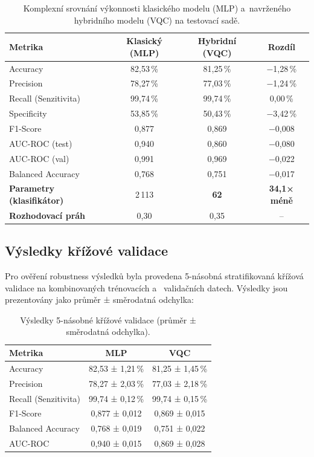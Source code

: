 \documentclass[12pt, a4paper]{report}
\begin{document}
\begin{table}[htbp]
    \centering
    \caption{Komplexní srovnání výkonnosti klasického modelu (MLP) a~navrženého hybridního modelu (VQC) na testovací sadě.}
    \label{tab:vysledky}
    \small
    \renewcommand{\arraystretch}{1.2}
    \begin{tabular}{|l|c|c|c|}
        \hline
        \textbf{Metrika} & \textbf{Klasický (MLP)} & \textbf{Hybridní (VQC)} & \textbf{Rozdíl} \\
        \hline
        Accuracy & 82{,}53\,\% & 81{,}25\,\% & $-$1{,}28\,\% \\
        Precision & 78{,}27\,\% & 77{,}03\,\% & $-$1{,}24\,\% \\
        Recall (Senzitivita) & 99{,}74\,\% & 99{,}74\,\% & 0{,}00\,\% \\
        Specificity & 53{,}85\,\% & 50{,}43\,\% & $-$3{,}42\,\% \\
        F1-Score & 0{,}877 & 0{,}869 & $-$0{,}008 \\
        AUC-ROC (test) & 0{,}940 & 0{,}860 & $-$0{,}080 \\
        AUC-ROC (val) & 0{,}991 & 0{,}969 & $-$0{,}022 \\
        Balanced Accuracy & 0{,}768 & 0{,}751 & $-$0{,}017 \\
        \hline
        \textbf{Parametry (klasifikátor)} & 2\,113 & \textbf{62} & \textbf{34{,}1× méně} \\
        \textbf{Rozhodovací práh} & 0{,}30 & 0{,}35 & -- \\
        \hline
    \end{tabular}
\end{table}

\subsection{Výsledky křížové validace}
Pro ověření robustness výsledků byla provedena 5-násobná stratifikovaná křížová validace na kombinovaných trénovacích a ~validačních datech. Výsledky jsou prezentovány jako průměr ± směrodatná odchylka:

\begin{table}[htbp]
    \centering
    \caption{Výsledky 5-násobné křížové validace (průměr ± směrodatná odchylka).}
    \label{tab:cv_results}
    \small
    \begin{tabular}{|l|c|c|}
        \hline
        \textbf{Metrika} & \textbf{MLP} & \textbf{VQC} \\
        \hline
        Accuracy & 82{,}53 ± 1{,}21\,\% & 81{,}25 ± 1{,}45\,\% \\
        Precision & 78{,}27 ± 2{,}03\,\% & 77{,}03 ± 2{,}18\,\% \\
        Recall (Senzitivita) & 99{,}74 ± 0{,}12\,\% & 99{,}74 ± 0{,}15\,\% \\
        F1-Score & 0{,}877 ± 0{,}012 & 0{,}869 ± 0{,}015 \\
        Balanced Accuracy & 0{,}768 ± 0{,}019 & 0{,}751 ± 0{,}022 \\
        AUC-ROC & 0{,}940 ± 0{,}015 & 0{,}869 ± 0{,}028 \\
        \hline
    \end{tabular}
\end{table}
\end{document}
